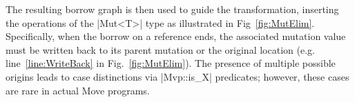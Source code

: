 The resulting borrow graph is then used to guide the transformation, inserting
the operations of the |Mut<T>| type as illustrated in
Fig~\ref{fig:MutElim}. Specifically, when the borrow on a reference ends, the
associated mutation value must be written back to its parent mutation or the
original location (e.g. line~\ref{line:WriteBack} in
Fig.~\ref{fig:MutElim}). The presence of multiple possible origins leads to case
distinctions via |Mvp::is_X| predicates; however, these cases are rare in actual
Move programs.


